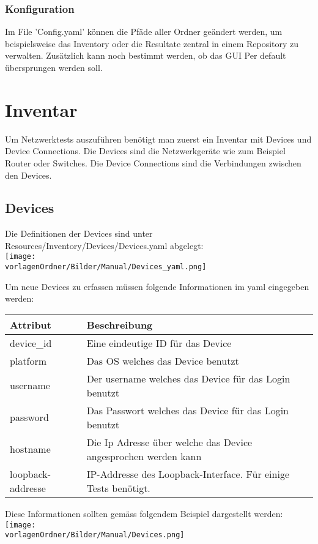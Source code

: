 \documentclass[
	ngerman,
	toc=listof, %
	toc=bibliography, %
	footnotes=multiple, %
	parskip=half, %
	numbers=noendperiod %
]{scrartcl}
\newcommand{\vorlagenOrdner}{../99_Vorlagen} %
\begin{document}
	\subsubsection{Konfiguration}
	Im File 'Config.yaml' können die Pfäde aller Ordner geändert werden, um beispielsweise
	das Inventory oder die Resultate zentral in einem Repository zu verwalten. 
	Zusätzlich kann noch bestimmt werden, ob das GUI Per default übersprungen werden soll.

\section{Inventar}
	Um Netzwerktests auszuführen benötigt man zuerst ein Inventar mit Devices und 
	Device Connections.
	Die Devices sind die Netzwerkgeräte wie zum Beispiel Router oder Switches.
	Die Device Connections sind die Verbindungen zwischen den Devices.

	\subsection{Devices}
		Die Definitionen der Devices sind unter Resources/Inventory/Devices/Devices.yaml abgelegt:\\
		\texttt{[image: \\vorlagenOrdner/Bilder/Manual/Devices\_yaml.png]}

		Um neue Devices zu erfassen müssen folgende Informationen im yaml eingegeben werden:\\
		\begin{tabularx}{\textwidth}{lX}
			\toprule
			Attribut & Beschreibung \\
			\midrule
			device\_id & Eine eindeutige ID für das Device \\
			platform & Das OS welches das Device benutzt \\
			username & Der username welches das Device für das Login benutzt\\
			password & Das Passwort welches das Device für das Login benutzt\\
			hostname & Die Ip Adresse über welche das Device angesprochen werden kann\\
			loopback-addresse & IP-Addresse des Loopback-Interface. Für einige Tests benötigt.\\
			\midrule
		\end{tabularx}

		Diese Informationen sollten gemäss folgendem Beispiel dargestellt werden: \\
		\texttt{[image: \\vorlagenOrdner/Bilder/Manual/Devices.png]}
\end{document}
